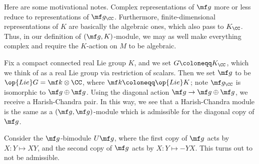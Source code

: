 \documentclass[../notes.tex]{subfiles}
\begin{document}
\begin{remark}
	Here are some motivational notes. Complex representations of $\mf g$ more or less reduce to representations of $\mf g_\CC$. Furthermore, finite-dimensional representations of $K$ are basically the algebraic ones, which also pass to $K_\CC$. Thus, in our definition of $(\mf g,K)$-module, we may as well make everything complex and require the $K$-action on $M$ to be algebraic.
\end{remark}
\begin{example}
	Fix a compact connected real Lie group $K$, and we set $G\coloneqq K_\CC$, which we think of as a real Lie group via restriction of scalars. Then we set $\mf g$ to be $\op{Lie}G=\mf k\otimes\CC$, where $\mf k\coloneqq\op{Lie}K$; note $\mf g_\CC$ is isomorphic to $\mf g\oplus\mf g$. Using the diagonal action $\mf g\to\mf g\oplus\mf g$, we receive a Harish-Chandra pair. In this way, we see that a Harish-Chandra module is the same as a $(\mf g,\mf g)$-module which is admissible for the diagonal copy of $\mf g$.
\end{example}
\begin{example}
	Consider the $\mf g$-bimodule $U\mf g$, where the first copy of $\mf g$ acts by $X\colon Y\mapsto XY$, and the second copy of $\mf g$ acts by $X\colon Y\mapsto-YX$. This turns out to not be admissible.
\end{example}
\end{document}

